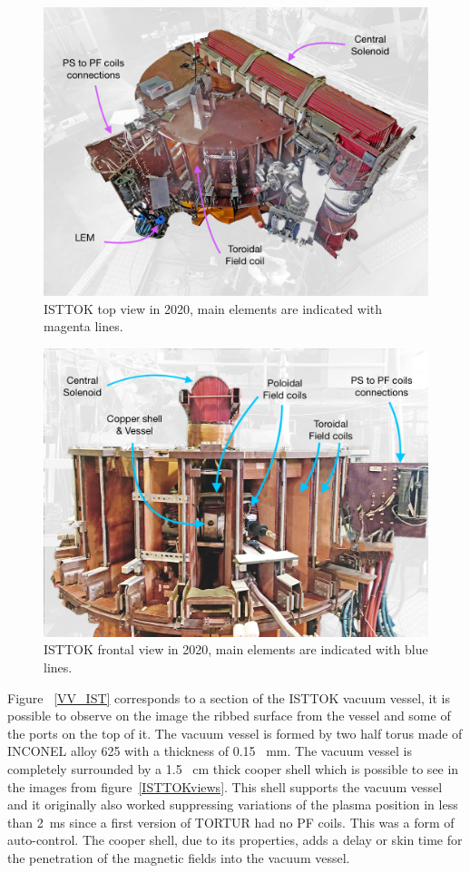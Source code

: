 \begin{figure}[htbp]
	\centering
	\includegraphics[width=1.1\textwidth]{Chp4/TopISTTOK.png}
	\caption{\label{TopISTTOK} ISTTOK top view in 2020,   main elements are indicated with magenta  lines.}
\end{figure}

\begin{figure}[htbp]
	\centering
	\includegraphics[width=1.1\textwidth]{Chp4/FrontISTTOK.png}
	\caption{\label{ISTTOK_front}ISTTOK frontal view in 2020, main elements are indicated with blue lines.   }
\end{figure}

Figure ~\ref{VV_IST} corresponds to a section of the ISTTOK vacuum vessel, it is possible to observe on the image the ribbed  surface from the vessel and some of the ports on the top of it. The vacuum vessel is formed by two half torus made of INCONEL alloy 625 with a thickness of 0.15~ mm. The vacuum vessel is completely surrounded by a 1.5 ~cm thick cooper shell which is possible to see in the images from figure~\ref{ISTTOKviews}. This shell supports the vacuum vessel and it originally  also worked suppressing  variations of the plasma position in less than 2~ms since a first version of TORTUR had no PF coils. This was a form of auto-control. The  cooper shell, due to its properties, adds a delay or skin time for the  penetration of the magnetic fields into the vacuum vessel.
\smallskip

